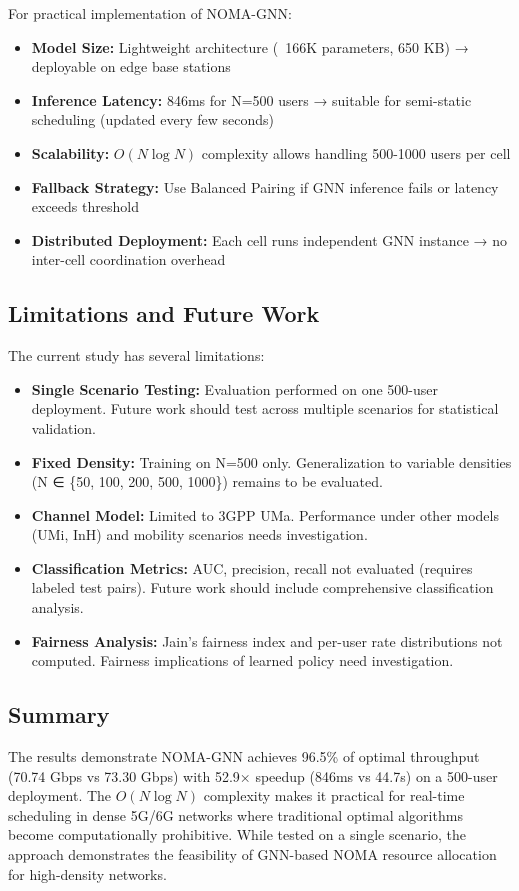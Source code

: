 For practical implementation of NOMA-GNN:

\begin{itemize}
    \item \textbf{Model Size:} Lightweight architecture (~166K parameters, 650 KB) → deployable on edge base stations
    \item \textbf{Inference Latency:} 846ms for N=500 users → suitable for semi-static scheduling (updated every few seconds)
    \item \textbf{Scalability:} $O(N \log N)$ complexity allows handling 500-1000 users per cell
    \item \textbf{Fallback Strategy:} Use Balanced Pairing if GNN inference fails or latency exceeds threshold
    \item \textbf{Distributed Deployment:} Each cell runs independent GNN instance → no inter-cell coordination overhead
\end{itemize}

\subsection{Limitations and Future Work}

The current study has several limitations:

\begin{itemize}
    \item \textbf{Single Scenario Testing:} Evaluation performed on one 500-user deployment. Future work should test across multiple scenarios for statistical validation.
    
    \item \textbf{Fixed Density:} Training on N=500 only. Generalization to variable densities (N ∈ \{50, 100, 200, 500, 1000\}) remains to be evaluated.
    
    \item \textbf{Channel Model:} Limited to 3GPP UMa. Performance under other models (UMi, InH) and mobility scenarios needs investigation.
    
    \item \textbf{Classification Metrics:} AUC, precision, recall not evaluated (requires labeled test pairs). Future work should include comprehensive classification analysis.
    
    \item \textbf{Fairness Analysis:} Jain's fairness index and per-user rate distributions not computed. Fairness implications of learned policy need investigation.
\end{itemize}

\subsection{Summary}

The results demonstrate NOMA-GNN achieves 96.5\% of optimal throughput (70.74 Gbps vs 73.30 Gbps) with 52.9× speedup (846ms vs 44.7s) on a 500-user deployment. The $O(N \log N)$ complexity makes it practical for real-time scheduling in dense 5G/6G networks where traditional optimal algorithms become computationally prohibitive. While tested on a single scenario, the approach demonstrates the feasibility of GNN-based NOMA resource allocation for high-density networks.
